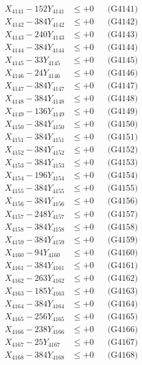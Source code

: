 \documentclass[a4paper,10pt]{article}
\begin{document}
{\begin{align}
\allowbreak
X_{4141} - 152Y_{4141} &\leq +0 && \text{(G4141)} \\
X_{4142} - 384Y_{4142} &\leq +0 && \text{(G4142)} \\
X_{4143} - 240Y_{4143} &\leq +0 && \text{(G4143)} \\
X_{4144} - 384Y_{4144} &\leq +0 && \text{(G4144)} \\
X_{4145} - 33Y_{4145} &\leq +0 && \text{(G4145)} \\
X_{4146} - 24Y_{4146} &\leq +0 && \text{(G4146)} \\
X_{4147} - 384Y_{4147} &\leq +0 && \text{(G4147)} \\
X_{4148} - 384Y_{4148} &\leq +0 && \text{(G4148)} \\
X_{4149} - 136Y_{4149} &\leq +0 && \text{(G4149)} \\
X_{4150} - 384Y_{4150} &\leq +0 && \text{(G4150)} \\
\allowbreak
X_{4151} - 384Y_{4151} &\leq +0 && \text{(G4151)} \\
X_{4152} - 384Y_{4152} &\leq +0 && \text{(G4152)} \\
X_{4153} - 384Y_{4153} &\leq +0 && \text{(G4153)} \\
X_{4154} - 196Y_{4154} &\leq +0 && \text{(G4154)} \\
X_{4155} - 384Y_{4155} &\leq +0 && \text{(G4155)} \\
X_{4156} - 384Y_{4156} &\leq +0 && \text{(G4156)} \\
X_{4157} - 248Y_{4157} &\leq +0 && \text{(G4157)} \\
X_{4158} - 384Y_{4158} &\leq +0 && \text{(G4158)} \\
X_{4159} - 384Y_{4159} &\leq +0 && \text{(G4159)} \\
X_{4160} - 94Y_{4160} &\leq +0 && \text{(G4160)} \\
\allowbreak
X_{4161} - 384Y_{4161} &\leq +0 && \text{(G4161)} \\
X_{4162} - 263Y_{4162} &\leq +0 && \text{(G4162)} \\
X_{4163} - 185Y_{4163} &\leq +0 && \text{(G4163)} \\
X_{4164} - 384Y_{4164} &\leq +0 && \text{(G4164)} \\
X_{4165} - 256Y_{4165} &\leq +0 && \text{(G4165)} \\
X_{4166} - 238Y_{4166} &\leq +0 && \text{(G4166)} \\
X_{4167} - 25Y_{4167} &\leq +0 && \text{(G4167)} \\
X_{4168} - 384Y_{4168} &\leq +0 && \text{(G4168)} \\

\end{align}}
\end{document}
